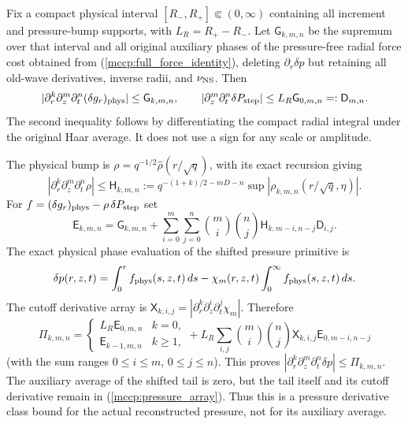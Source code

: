 Fix a compact physical interval $[R_-,R_+]\Subset(0,\infty)$ containing
all increment and pressure-bump supports, with $L_R=R_+-R_-$. Let
$\mathsf G_{k,m,n}$ be the supremum over that interval and all original
auxiliary phases of the pressure-free radial force cost obtained from
(\ref{mccp:full_force_identity}), deleting $\partial_r\delta p$ but
retaining all old-wave derivatives, inverse radii, and $\nu_{\rm NS}$. Then
\begin{equation}\label{mccp:pressure_free}
 |\partial_r^k\partial_z^m\partial_t^n(\delta g_r)_{\rm phys}|
 \le\mathsf G_{k,m,n},\qquad
 |\partial_z^m\partial_t^n\delta P_{\rm step}|
 \le L_R\mathsf G_{0,m,n}=:\mathsf D_{m,n}.
\end{equation}
The second inequality follows by differentiating the compact radial
integral under the original Haar average. It does not use a sign for any
scale or amplitude.

The physical bump is $\rho=q^{-1/2}\widehat\rho(r/\sqrt q)$, with its
exact recursion giving
\[
 |\partial_r^k\partial_z^m\partial_t^n\rho|
 \le \mathsf H_{k,m,n}:=
 q^{-(1+k)/2-mD-n}\sup|\rho_{k,m,n}(r/\sqrt q,\eta)|.
\]
For $f=(\delta g_r)_{\rm phys}-\rho\,\delta P_{\rm step}$ set
\begin{equation}\label{mccp:pressure_source_array}
 \mathsf E_{k,m,n}=\mathsf G_{k,m,n}+
 \sum_{i=0}^m\sum_{j=0}^n\binom{m}{i}\binom{n}{j}
       \mathsf H_{k,m-i,n-j}\mathsf D_{i,j}.
\end{equation}
The exact physical phase evaluation of the shifted pressure primitive is
\[
 \delta p(r,z,t)=\int_0^r f_{\rm phys}(s,z,t)\,ds
 -\chi_m(r,z,t)\int_0^\infty f_{\rm phys}(s,z,t)\,ds.
\]
The cutoff derivative array is
$\mathsf X_{k,i,j}=|\partial_r^k\partial_z^i\partial_t^j\chi_m|$. Therefore
\begin{equation}\label{mccp:pressure_array}
 \mathsf\Pi_{k,m,n}=\begin{cases}L_R\mathsf E_{0,m,n}&k=0,\\
 \mathsf E_{k-1,m,n}&k\ge1,\end{cases}
 +L_R\sum_{i,j}\binom{m}{i}\binom{n}{j}
       \mathsf X_{k,i,j}\mathsf E_{0,m-i,n-j}
\end{equation}
(with the sum ranges $0\le i\le m$, $0\le j\le n$). This proves
$|\partial_r^k\partial_z^m\partial_t^n\delta p|\le\mathsf\Pi_{k,m,n}$.
The auxiliary average of the shifted tail is zero, but the tail itself and
its cutoff derivative remain in (\ref{mccp:pressure_array}). Thus this is a
pressure derivative class bound for the actual reconstructed pressure,
not for its auxiliary average.

